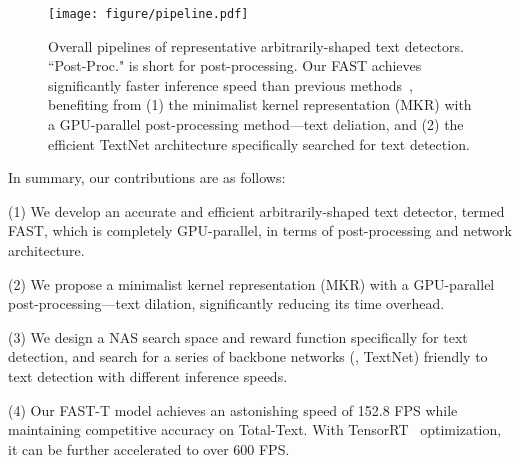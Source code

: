 \documentclass[lettersize,journal]{IEEEtran}
\begin{document}
\begin{figure}[tbp]
\renewcommand{\arraystretch}{1}
    \centering
    \small
    \texttt{[image: figure/pipeline.pdf]}
    \vspace{0.7em}
    \caption{
    Overall pipelines of representative arbitrarily-shaped text detectors.
    ``Post-Proc." is short for post-processing.
    Our FAST achieves significantly faster inference speed than previous methods~\cite{wang2019shape, wang2019efficient, liao2020real}, benefiting from (1) the minimalist kernel representation (MKR) with a GPU-parallel post-processing method---text deliation, and (2) the efficient TextNet architecture specifically searched for text detection.
    }
    \label{fig:pipeline}
\end{figure}


In summary, our contributions are as follows:

(1) We develop an accurate and efficient arbitrarily-shaped text detector, termed FAST, which is completely GPU-parallel, in terms of post-processing and network architecture.

(2) We propose a minimalist kernel representation (MKR) with a GPU-parallel post-processing---text dilation, significantly reducing its time overhead.

(3) We design a NAS search space and reward function specifically for text detection, and search for a series of backbone networks 
(\ie, TextNet) friendly to text detection with different inference speeds.

(4) Our FAST-T model achieves an astonishing speed of 152.8 FPS while maintaining competitive accuracy on Total-Text. 
With TensorRT~\cite{vanholder2016efficient} optimization, it can be further accelerated to over 600 FPS.
\end{document}
